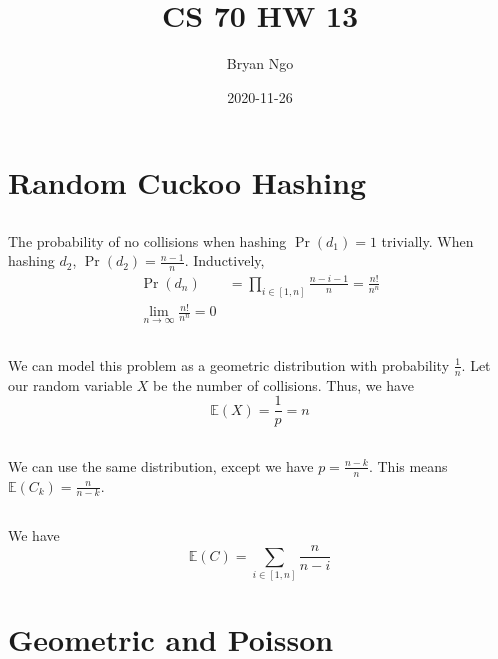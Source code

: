 \documentclass{article}
\title{CS 70 HW 13}
\author{Bryan Ngo}
\date{2020-11-26}
\newcommand{\E}{\mathbb{E}}
\begin{document}
\maketitle

\section{Random Cuckoo Hashing}

\subsection{}

The probability of no collisions when hashing \(\Pr(d_1) = 1\) trivially.
When hashing \(d_2\), \(\Pr(d_2) = \frac{n - 1}{n}\).
Inductively,
\begin{align}
    \Pr(d_n) &= \prod_{i \in [1, n]} \frac{n - i - 1}{n} = \frac{n!}{n^n} \\
    \lim_{n \to \infty} \frac{n!}{n^n} = 0
\end{align}

\subsection{}

We can model this problem as a geometric distribution with probability \(\frac{1}{n}\).
Let our random variable \(X\) be the number of collisions.
Thus, we have
\begin{equation}
    \E(X) = \frac{1}{p} = n
\end{equation}

\subsection{}

We can use the same distribution, except we have \(p = \frac{n - k}{n}\).
This means \(\E(C_k) = \frac{n}{n - k}\).

\subsection{}

We have
\begin{equation}
    \E(C) = \sum_{i \in [1, n]} \frac{n}{n - i}
\end{equation}

\section{Geometric and Poisson}
\end{document}
